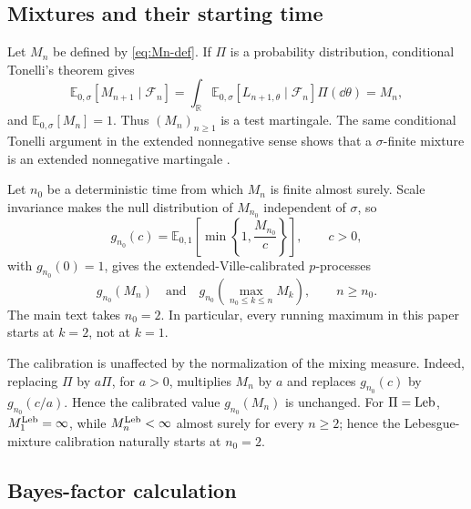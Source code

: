 \subsection{Mixtures and their starting time}
\label{app:mixture-martingales}

Let \(M_n\) be defined by \eqref{eq:Mn-def}. If \(\Pi\) is a
probability distribution, conditional Tonelli's theorem gives
\[
  \mathbb E_{0,\sigma}
  \left[M_{n+1}\mid\mathcal F_n\right]
  =
  \int_{\mathbb R}
  \mathbb E_{0,\sigma}
  \left[L_{n+1,\theta}\mid\mathcal F_n\right]
  \Pi(\dd\theta)
  =M_n,
\]
and \(\mathbb E_{0,\sigma}[M_n]=1\). Thus
\((M_n)_{n\geq1}\) is a test martingale. The same conditional
Tonelli argument in the extended nonnegative sense shows that a
\(\sigma\)-finite mixture is an extended nonnegative martingale
\citep{Wang2025a}.

Let \(n_0\) be a deterministic time from which \(M_n\) is finite
almost surely. Scale invariance makes the null distribution of
\(M_{n_0}\) independent of \(\sigma\), so
\[
  g_{n_0}(c)
  =
  \mathbb E_{0,1}
  \left[
    \min\left\{1,\frac{M_{n_0}}{c}\right\}
  \right],
  \qquad c>0,
\]
with \(g_{n_0}(0)=1\), gives the extended-Ville-calibrated
\(p\)-processes
\[
  g_{n_0}(M_n)
  \quad\text{and}\quad
  g_{n_0}\!\left(
    \max_{n_0\leq k\leq n}M_k
  \right),
  \qquad n\geq n_0.
\]
The main text takes \(n_0=2\). In particular, every running maximum in
this paper starts at \(k=2\), not at \(k=1\).

The calibration is unaffected by the normalization of the mixing
measure. Indeed, replacing \(\Pi\) by \(a\Pi\), for \(a>0\),
multiplies \(M_n\) by \(a\) and replaces \(g_{n_0}(c)\) by
\(g_{n_0}(c/a)\). Hence the calibrated value \(g_{n_0}(M_n)\) is
unchanged.
For \(\Pi=\mathrm{Leb}\), \(M_1^{\mathrm{Leb}}=\infty\), while
\(M_n^{\mathrm{Leb}}<\infty\) almost surely for every \(n\geq2\); hence the
Lebesgue-mixture calibration naturally starts at \(n_0=2\).


\subsection{Bayes-factor calculation}
\label{app:bayes-factor-derivation}

